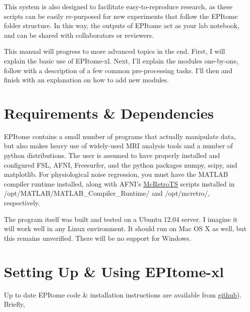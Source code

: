 \documentclass[final,titlepage,letterpaper,oneside,12pt]{article}
\renewcommand{\texttt}[2][BrickRed]{\textcolor{#1}{\ttfamily #2}}%
\begin{document}
This system is also designed to facilitate easy-to-reproduce research, as these scripts can be easily re-purposed for new experiments that follow the EPItome folder structure. In this way, the outputs of EPItome act as your lab notebook, and can be shared with collaborators or reviewers.

This manual will progress to more advanced topics in the end. First, I will explain the basic use of EPItome-xl. Next, I'll explain the modules one-by-one, follow with a description of a few common pre-processing tasks. I'll then  and finish with an explanation on how to add new modules.

\section{Requirements \& Dependencies}

EPItome contains a small number of programs that actually manipulate data, but also makes heavy use of widely-used MRI analysis tools and a number of python distributions. The user is assumed to have properly installed and configured FSL, AFNI, Freesurfer, and the python packages numpy, scipy, and matplotlib. For physiological noise regression, you must have the MATLAB compiler runtime installed, along with AFNI's \href{http://afni.nimh.nih.gov/sscc/dglen/McRetroTS}{McRetroTS} scripts installed in \texttt{/opt/MATLAB/MATLAB\_Compiler\_Runtime/} and \texttt{/opt/mcretro/}, respectively.

The program itself was built and tested on a Ubuntu 12.04 server. I imagine it will work well in any Linux environment. It should run on Mac OS X as well, but this remains unverified. There will be no support for Windows.

\section{Setting Up \& Using EPItome-xl}

Up to date EPItome code \& installation instructions are available from \href{https://github.com/josephdviviano/EPItome-xl}{github}). Briefly, \\
\end{document}
